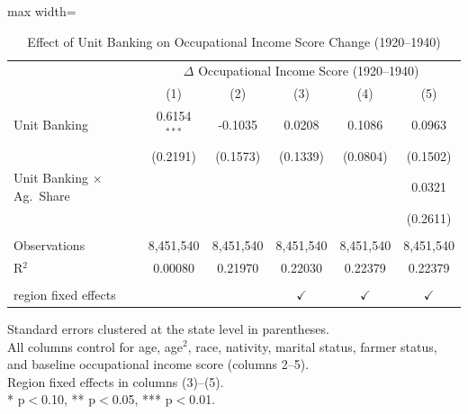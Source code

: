 
\begin{table}[htbp]
   \caption{\label{tab:main} Effect of Unit Banking on Occupational Income Score Change (1920--1940)}
   \bigskip
   \centering
   \begin{adjustbox}{max width=\textwidth}
   \begin{tabular}{lccccc}
      \toprule
       & \multicolumn{5}{c}{$\Delta$ Occupational Income Score (1920--1940)}\\
                                         & (1)            & (2)       & (3)           & (4)           & (5)\\  
      \midrule 
      Unit Banking                       & 0.6154$^{***}$ & -0.1035   & 0.0208        & 0.1086        & 0.0963\\   
                                         & (0.2191)       & (0.1573)  & (0.1339)      & (0.0804)      & (0.1502)\\   
      Unit Banking $\times$ Ag.\ Share   &                &           &               &               & 0.0321\\   
                                         &                &           &               &               & (0.2611)\\   
       \\
      Observations                       & 8,451,540      & 8,451,540 & 8,451,540     & 8,451,540     & 8,451,540\\  
      R$^2$                              & 0.00080        & 0.21970   & 0.22030       & 0.22379       & 0.22379\\  
       \\
      region fixed effects               &                &           & $\checkmark$  & $\checkmark$  & $\checkmark$\\   
      \bottomrule
   \end{tabular}
   \end{adjustbox}

   \par \raggedright
   Standard errors clustered at the state level in parentheses.\\
   All columns control for age, age$^2$, race, nativity, marital status, farmer status, and baseline occupational income score (columns 2--5).\\
   Region fixed effects in columns (3)--(5).\\
   * p$<$0.10, ** p$<$0.05, *** p$<$0.01.
\end{table}


